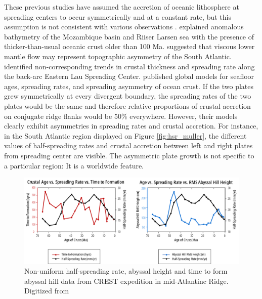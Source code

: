 \documentclass[letterpaper,12pt,notitle]{memphisthesis}                     %
\begin{document}
These previous studies have assumed the accretion of oceanic lithosphere at spreading centers to occur symmetrically and at a constant rate, but this assumption is not consistent with various observations \citep{Castelino2016, Flament2014, Martinez2006, Muller1998, Muller2008, Fedotova2017}. \citet{Castelino2016} explained anomalous bathymetry of the Mozambique basin and Riiser Larsen sea with the presence of thicker-than-usual oceanic crust older than 100 Ma. \citet{Flament2014} suggested that viscous lower mantle flow may represent topographic asymmetry of the South Atlantic. \citet{Martinez2006} identified non-corresponding trends in crustal thickness and spreading rate along the back-arc Eastern Lau Spreading Center. \citet{Muller2008} published global models for seafloor ages, spreading rates, and spreading asymmetry of ocean crust. If the two plates grew symmetrically at every divergent boundary, the spreading rates of the two plates would be the same and therefore relative proportions of crustal accretion on conjugate ridge flanks would be 50\% everywhere. However, their models clearly exhibit asymmetries in spreading rates and crustal accretion. For instance, in the South Atlantic region displayed on Figure \ref{fig:hsr_muller}, the different values of half-spreading rates and crustal accretion between left and right plates from spreading center are visible. The asymmetric plate growth is not specific to a particular region: It is a worldwide feature.
%
\begin{figure}[!htb]
	\centering
	\includegraphics[width=0.99\linewidth]{./figs/hsrgraph1.pdf}
	\caption{Non-uniform half-spreading rate, abyssal height and time to form abyssal hill data from CREST expedition in mid-Atlantinc Ridge. Digitized from \citet{Fedotova2017}}
	\label{fig:hsr_fedotova}
\end{figure}
\end{document}
